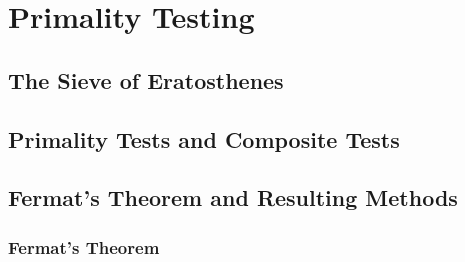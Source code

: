 \documentclass{article}
\begin{document}
\newpage



\section{Primality Testing}


\subsection{ The Sieve of Eratosthenes }


\subsection{ Primality Tests and Composite Tests}

\subsection {Fermat's Theorem and Resulting Methods}
	
\subsubsection{Fermat's Theorem}
\end{document}
